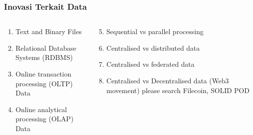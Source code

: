 \documentclass[aspectratio=169, table]{beamer}
\begin{document}
	\begin{frame}
		\frametitle{Inovasi Terkait Data}
		\begin{columns}
			\begin{column}{0.5\textwidth}
				\begin{center}
					\begin{enumerate}
						\item Text and Binary Files
						\item Relational Database Systems (RDBMS)
						\item Online transaction processing (OLTP) Data
						\item Online analytical processing (OLAP) Data

					\end{enumerate}
				\end{center}
			\end{column}
			\begin{column}{0.5\textwidth}
				\begin{center}
					\begin{enumerate}
						\setcounter{enumi}{4}

						\item Sequential vs parallel processing
						\item Centralised vs distributed data
						\item Centralised vs federated data
						\item Centralised vs Decentralised data (Web3 movement) please search Filecoin, SOLID POD
					\end{enumerate}
				\end{center}
			\end{column}
		\end{columns}
	\end{frame}
\end{document}
